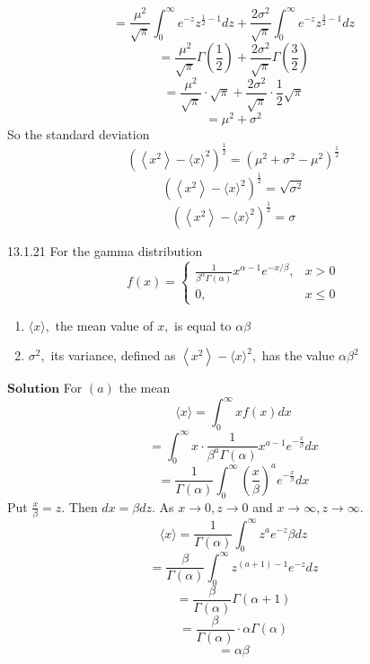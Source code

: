 \documentclass{styles/kaobook}
\begin{document}
$$=\frac{\mu^{2}}{\sqrt{\pi}} \int_{0}^{\infty} e^{-z} z^{\frac{1}{2}-1} d z+\frac{2 \sigma^{2}}{\sqrt{\pi}} \int_{0}^{\infty} e^{-z} z^{\frac{3}{2}-1} d z$$
$$=\frac{\mu^{2}}{\sqrt{\pi}} \Gamma\left(\frac{1}{2}\right)+\frac{2 \sigma^{2}}{\sqrt{\pi}} \Gamma\left(\frac{3}{2}\right)$$
$$=\frac{\mu^{2}}{\sqrt{\pi}} \cdot \sqrt{\pi}+\frac{2 \sigma^{2}}{\sqrt{\pi}} \cdot \frac{1}{2} \sqrt{\pi}$$
$$=\mu^{2}+\sigma^{2}$$
So the standard deviation 
$$\left(\left\langle x^{2}\right\rangle-\langle x\rangle^{2}\right)^{\frac{1}{2}}=\left(\mu^{2}+\sigma^{2}-\mu^{2}\right)^{\frac{1}{2}}$$
$$\left(\left\langle x^{2}\right\rangle-\langle x\rangle^{2}\right)^{\frac{1}{2}}=\sqrt{\sigma^{2}}$$
$$\left(\left\langle x^{2}\right\rangle-\langle x\rangle^{2}\right)^{\frac{1}{2}}=\sigma$$



\begin{greenbox}{13.1.21}
For the gamma distribution
$$
f(x)=\left\{\begin{array}{ll}
\frac{1}{\beta^{\alpha} \Gamma(\alpha)} x^{\alpha-1} e^{-x / \beta}, & x>0 \\
0, & x \leq 0
\end{array}\right.
$$
\begin{enumerate}[$(a)$]
\item $\langle x\rangle,$ the mean value of $x,$ is equal to $\alpha \beta$
\item $\sigma^{2},$ its variance, defined as $\left\langle x^{2}\right\rangle-\langle x\rangle^{2},$ has the value $\alpha \beta^{2}$
\end{enumerate}
\end{greenbox}

$\boxed{\textbf{Solution}}$ For $(a)$ the mean
$$
\langle x\rangle=\int_{0}^{\infty} x f(x) d x
$$
$$=\int_{0}^{\infty} x \cdot \frac{1}{\beta^{a} \Gamma(\alpha)} x^{a-1} e^{-\frac{x}{\beta}} d x$$
$$=\frac{1}{\Gamma(\alpha)} \int_{0}^{\infty}\left(\frac{x}{\beta}\right)^{a} e^{-\frac{x}{\beta}} d x$$
Put $\frac{x}{\beta}=z .$ Then $d x=\beta d z .$ As $x \rightarrow 0, z \rightarrow 0$ and $x \rightarrow \infty, z \rightarrow \infty$.
$$
\langle x\rangle=\frac{1}{\Gamma(\alpha)} \int_{0}^{\infty} z^{a} e^{-z} \beta d z
$$
$$=\frac{\beta}{\Gamma(\alpha)} \int_{0}^{\infty} z^{(a+1)-1} e^{-z} d z$$
$$=\frac{\beta}{\Gamma(\alpha)} \Gamma(\alpha+1)$$
$$=\frac{\beta}{\Gamma(\alpha)} \cdot \alpha \Gamma(\alpha)$$
$$=\alpha \beta$$
\end{document}
